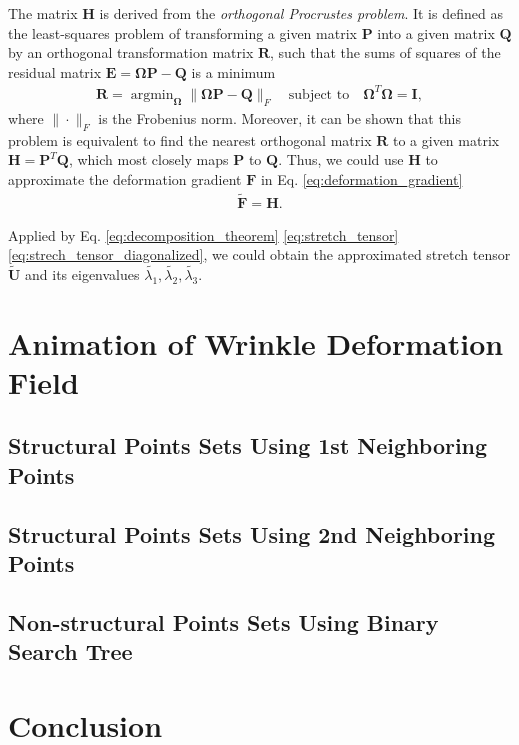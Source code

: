 \documentclass{llncs}
\begin{document}
The matrix $\mathbf{H}$ is derived from the \emph{orthogonal Procrustes problem}\cite{schonemann1966generalized}. It is defined as the least-squares problem of transforming a given matrix $\mathbf{P}$ into a given matrix $\mathbf{Q}$ by an orthogonal transformation matrix $\mathbf{R}$, such that the sums of squares of the residual matrix $\mathbf{E}=\mathbf{\Omega} \mathbf{P} - \mathbf{Q}$ is a minimum
\begin{align}
\mathbf{R}=\mathop{\arg\min}_{\mathbf{\Omega}} \| \mathbf{\Omega} \mathbf{P} - \mathbf{Q} \|_{F} \quad \mbox{subject to} \quad \mathbf{\Omega}^T\mathbf{\Omega}=\mathbf{I},
\end{align}
where $\| \cdot \|_{F}$ is the Frobenius norm. Moreover, it can be shown\cite{zhang2000flexible} that this problem is equivalent to find the nearest orthogonal matrix $\mathbf{R}$ to a given matrix $\mathbf{H} = \mathbf{P}^T \mathbf{Q}$, which most closely maps $\mathbf{P}$ to $\mathbf{Q}$. Thus, we could use $\mathbf{H}$ to approximate the deformation gradient $\mathbf{F}$ in Eq. \eqref{eq:deformation_gradient}
\begin{align}
\widetilde{\mathbf{F}} = \mathbf{H}.
\end{align}

Applied by Eq. \eqref{eq:decomposition_theorem} \eqref{eq:stretch_tensor} \eqref{eq:strech_tensor_diagonalized}, we could obtain the approximated stretch tensor $\widetilde{\mathbf{U}}$ and its eigenvalues $\tilde{\lambda_1},\tilde{\lambda_2},\tilde{\lambda_3}$.

\section{Animation of Wrinkle Deformation Field}
\subsection{Structural Points Sets Using 1st Neighboring Points}


\subsection{Structural Points Sets Using 2nd Neighboring Points}

\subsection{Non-structural Points Sets Using Binary Search Tree}


\section{Conclusion}


%

%
%


%
\end{document}
